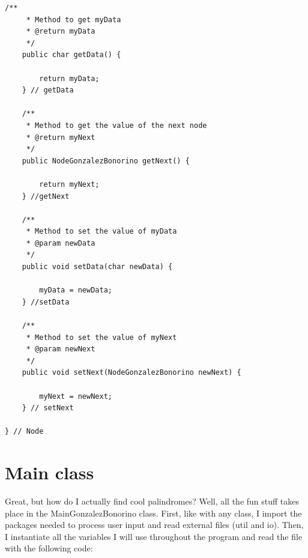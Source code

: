 \documentclass[letterpaper, 10pt]{article}
\begin{document}
\begin{lstlisting}
/**
	 * Method to get myData
	 * @return myData
	 */
	public char getData() {
		
		return myData;
	} // getData
	
	/**
	 * Method to get the value of the next node
	 * @return myNext
	 */
	public NodeGonzalezBonorino getNext() {
		
		return myNext;
	} //getNext
	
	/**
	 * Method to set the value of myData
	 * @param newData
	 */
	public void setData(char newData) {
		
		myData = newData;
	} //setData
	
	/**
	 * Method to set the value of myNext
	 * @param newNext
	 */
	public void setNext(NodeGonzalezBonorino newNext) {
		
		myNext = newNext;
	} // setNext
	
} // Node
\end{lstlisting}

\section{Main class}

Great, but how do I actually find cool palindromes? Well, all the fun stuff takes place in the MainGonzalezBonorino class. First, like with any class, I import the packages needed to process user input and read external files (util and io). Then, I instantiate all the variables I will use throughout the program and read the file with the following code:
\end{document}
